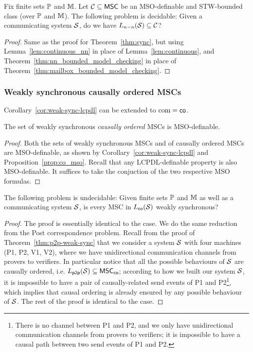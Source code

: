 \documentclass{article}
\begin{document}
\begin{theorem}\label{thm:sync_nn}
	Fix finite sets $\mathbb{P}$ and $\mathbb{M}$.
	Let $\mathcal{C} \subseteq \mathsf{MSC}$ be an MSO-definable and STW-bounded class (over $\mathbb{P}$ and $\mathbb{M}$).
	The following problem is decidable:
	Given a communicating system $\mathcal{S}$, do we have $L_{n\mathsf{-}n}(\mathcal{S}) \subseteq \mathcal{C}$?
	\end{theorem}
\begin{proof}
Same as the proof for Theorem~\ref{thm:sync}, but using Lemma~\ref{lem:continuous_nn} in place of Lemma~\ref{lem:continuous}, and Theorem~\ref{thm:nn_bounded_model_checking} in place of Theorem~\ref{thm:mailbox_bounded_model_checking}.
\end{proof}

\subsubsection{Weakly synchronous causally ordered MSCs}

Corollary~\ref{cor:weak-sync-lcpdl} can  be extended to $\textup{com} = \mathsf{co}$. 

\begin{proposition}\label{cor:co-weak-sync-mso}
The set of weakly synchronous \emph{causally ordered} MSCs is MSO-definable.
\end{proposition}
\begin{proof}
Both the sets of weakly synchronous MSCs and of causally ordered MSCs are MSO-definable, as shown by Corollary~\ref{cor:weak-sync-lcpdl} and Proposition~\ref{prop:co_mso}. Recall that any LCPDL-definable property is also MSO-definable. It suffices to take the conjuction of the two respective MSO formulas.
\end{proof}

\begin{theorem}\label{thm:co-weak-sync}
The following problem is undecidable:
Given finite sets $\mathbb{P}$ and $\mathbb{M}$ as well as a communicating system $\mathcal{S}$,
is every MSC in $L_{\mathsf{co}}(\mathcal{S})$ weakly synchronous?
\end{theorem}
\begin{proof}
The proof is essentially identical to the \pp case. We do the same reduction from the Post correspondence problem. Recall from the proof of Theorem~\ref{thm:p2p-weak-sync} that we consider a system $\mathcal{S}$ with four machines (P1, P2, V1, V2), where we have unidirectional communication channels from provers to verifiers. In particular notice that all the possible behaviours of $\mathcal{S}$ are causally ordered, i.e. $L_{\mathsf{p2p}}(\mathcal{S}) \subseteq \mathsf{MSC}_{\mathsf{co}}$; according to how we built our system $\mathcal{S}$, it is impossible to have a pair of causally-related send events of P1 and P2\footnote{There is no channel between P1 and P2, and we only have unidirectional communication channels from provers to verifiers; it is impossible to have a causal path between two send events of P1 and P2.}, which implies that causal ordering is already ensured by any possible \pp behaviour of $\mathcal{S}$. The rest of the proof is identical to the \pp case.
\end{proof}
\end{document}
